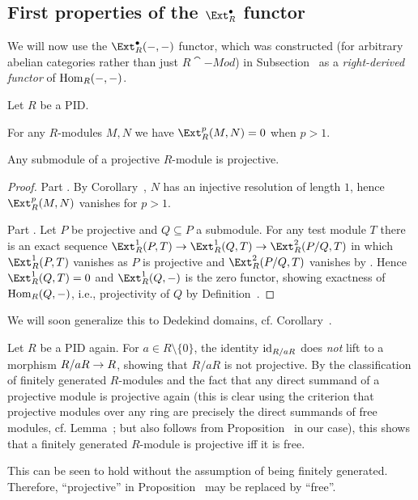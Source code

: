 \documentclass[a4paper,parskip=half,numbers=enddot, DIV=12]{scrreprt}
\begin{document}
\subsection{First properties of the \texorpdfstring{$\Ext_R^\bullet$}{Ext} functor}
We will now use the $\Ext_R^\bullet(-,-)$ functor, which was constructed (for arbitrary abelian categories rather than just $R\cat{-Mod}$) in Subsection~ as a \emph{right-derived functor} of $\operatorname{Hom}_R(-,-)$.
\begin{prop}
	Let $R$ be a PID.
	\begin{alphanumerate}
		\item For any $R$-modules $M,N$ we have $\Ext_R^p(M,N)=0$ when $p>1$.
		\item Any submodule of a projective $R$-module is projective.
	\end{alphanumerate}
\end{prop}
\begin{proof}
	Part . By Corollary~, $N$ has an injective resolution of length $1$, hence $\Ext_R^p(M,N)$ vanishes for $p>1$.
	
	Part . Let $P$ be projective and $Q\subseteq P$ a submodule. For any test module $T$ there is an exact sequence $\Ext_R^1(P,T)\morphism\Ext_R^1(Q,T)\morphism\Ext_R^2(P/Q,T)$ in which $\Ext_R^1(P,T)$ vanishes as $P$ is projective and $\Ext_R^2(P/Q,T)$ vanishes by . Hence $\Ext_R^1(Q,T)=0$ and $\Ext_R^1(Q,-)$ is the zero functor, showing exactness of $\operatorname{Hom}_R(Q,-)$, i.e., projectivity of $Q$ by Definition~.
\end{proof}
\begin{rem*}
	\begin{alphanumerate}
		\item We will soon generalize this to Dedekind domains, cf. Corollary~.
		\item Let $R$ be a PID again. For $a\in R\setminus \{0\}$, the identity $\operatorname{id}_{R/aR}$ does \emph{not} lift to a morphism $R/aR\morphism R$, showing that $R/aR$ is not projective. By the classification of finitely generated $R$-modules and the fact that any direct summand of a projective module is projective again (this is clear using the criterion that projective modules over any ring are precisely the direct summands of free modules, cf. Lemma~; but also follows from Proposition~ in our case), this shows that a finitely generated $R$-module is projective iff it is free.
		
		This can be seen to hold without the assumption of being finitely generated. Therefore, ``projective'' in Proposition~ may be replaced by ``free''.
	\end{alphanumerate}
\end{rem*}
\end{document}
